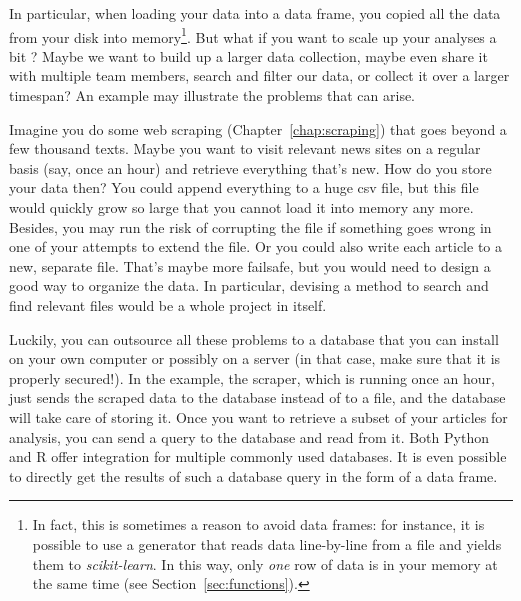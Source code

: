 In particular, when loading your data into a data frame, you copied all
the data from your disk into memory\footnote{In fact, this is
  sometimes a reason to avoid data frames: for instance, it is possible
  to use a generator that reads data line-by-line from a file and
  yields them to \emph{scikit-learn}. In this way, only \emph{one} row
  of data is in your memory at the same time (see Section~\ref{sec:functions}).}.
But what if you want to scale up your analyses a bit
\cite[see][]{Trilling2018b}? Maybe we want to build up a larger
data collection, maybe even share it with multiple team members, search
and filter our data, or collect it over a larger timespan? An
example may illustrate the problems that can arise.

Imagine you do some web scraping (Chapter~\ref{chap:scraping}) that goes beyond
a few thousand texts. Maybe you want to visit relevant news sites on a
regular basis (say, once an hour) and retrieve everything that's
new. How do you store your data then? You could append everything to a
huge csv file, but this file would quickly grow so large that you
cannot load it into memory any more. Besides, you may run the risk of
corrupting the file if something goes wrong in one of your attempts to
extend the file. Or you could also write each article to a new, separate file.
That's maybe more failsafe, but you would need to design a good way
to organize the data. In particular, devising a method to search
and find relevant files would be a whole project in itself.

Luckily, you can outsource all these problems to a database that you can
install on your own computer or possibly on a server (in that case, make
sure that it is properly secured!). In the example, the scraper, which
is running once an hour, just sends the scraped data to the database
instead of to a file, and the database will take care of storing it.
Once you want to retrieve a subset of your articles for analysis,
you can send a query to the database and read from it. Both Python and
R offer integration for multiple commonly used databases. It is even
possible to directly get the results of such a database query in the
form of a data frame.

